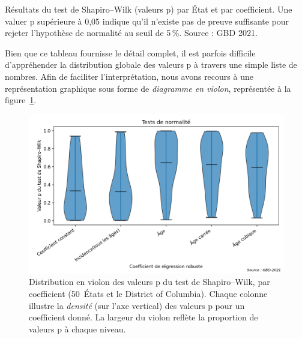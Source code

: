 \begin{table}[H]
	\centering
	\caption{Résultats du test de Shapiro--Wilk (valeurs p) par État et par coefficient. Une valuer p supérieure à 0,05 indique qu’il n'existe pas de preuve suffisante pour rejeter l'hypothèse de normalité au seuil de 5\,\%. Source : GBD 2021.}
	\label{tab:shapiro}
	\scalebox{0.85}{}
\end{table}

Bien que ce tableau fournisse le détail complet, il est parfois difficile d'appréhender la distribution globale des valeurs p à travers une simple liste de nombres. Afin de faciliter l'interprétation, nous avons recours à une représentation graphique sous forme de \emph{diagramme en violon}, représentée à la figure~\ref{fig:shapiro-violin}.

\begin{figure}[H]
	\centering
	\includegraphics[width=1\textwidth]{images/shapiro_violin.png}
	\caption{Distribution en violon des valeurs p du test de Shapiro--Wilk, par coefficient (50~États et le District of Columbia). 
		Chaque colonne illustre la \emph{densité} (sur l'axe vertical) des valeurs p pour un coefficient donné. 
		La largeur du violon reflète la proportion de valeurs p à chaque niveau.}
	\label{fig:shapiro-violin}
\end{figure}

